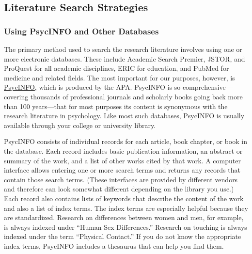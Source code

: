 \documentclass[
]{krantz}
\begin{document}
\hypertarget{literature-search-strategies}{%
\subsection*{Literature Search Strategies}\label{literature-search-strategies}}


\hypertarget{using-psycinfo-and-other-databases}{%
\subsubsection*{Using PsycINFO and Other Databases}\label{using-psycinfo-and-other-databases}}


The primary method used to search the research literature involves using one or more electronic databases. These include Academic Search Premier, JSTOR, and ProQuest for all academic disciplines, ERIC for education, and PubMed for medicine and related fields. The most important for our purposes, however, is \protect\hyperlink{psycinfo}{PsycINFO}, which is produced by the APA. PsycINFO is so comprehensive---covering thousands of professional journals and scholarly books going back more than 100 years---that for most purposes its content is synonymous with the research literature in psychology. Like most such databases, PsycINFO is usually available through your college or university library.

PsycINFO consists of individual records for each article, book chapter, or book in the database. Each record includes basic publication information, an abstract or summary of the work, and a list of other works cited by that work. A computer interface allows entering one or more search terms and returns any records that contain those search terms. (These interfaces are provided by different vendors and therefore can look somewhat different depending on the library you use.) Each record also contains lists of keywords that describe the content of the work and also a list of index terms. The index terms are especially helpful because they are standardized. Research on differences between women and men, for example, is always indexed under ``Human Sex Differences.'' Research on touching is always indexed under the term ``Physical Contact.'' If you do not know the appropriate index terms, PsycINFO includes a thesaurus that can help you find them.
\end{document}
